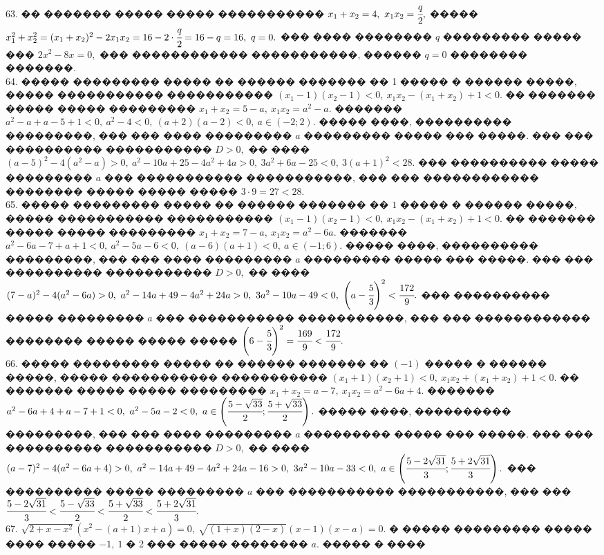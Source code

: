 \documentclass[12pt]{article}
\begin{document}
63. �� ������� ����� ����� ����������� $x_1+x_2=4,\ x_1x_2=\cfrac{q}{2},$ ����� $x_1^2+x_2^2=(x_1+x_2)^2-2x_1x_2=16-2\cdot\cfrac{q}{2}=16-q=16,\ q=0.$ ��� ���� �������� $q$ ��������� ����� ��� $2x^2-8x=0,$ ��� ������������ �����������, ������ $q=0$ �������� �������.\\
64. ����� ��������� ����� �� ������ ������� �� 1 ����� � ������ �����, ����� ����������� ����������� $(x_1-1)(x_2-1)<0,\ x_1x_2-(x_1+x_2)+1<0.$ �� ������� ����� ����� ��������� $x_1+x_2=5-a,\ x_1x_2=a^2-a.$ ������� $a^2-a+a-5+1<0,\
a^2-4<0,\ (a+2)(a-2)<0,\ a\in(-2;2).$ ����� ����, ���������� ���������, ��� ��� ���� ��������� $a$ ��������� ����� ��� �����. ��� ��� ���������� ����������� $D>0,$ �� ���� $(a-5)^2-4(a^2-a)>0,\ a^2-10a+25-4a^2+4a>0,\ 3a^2+6a-25<0,\ 3(a+1)^2<28.$ ��� ���������� ����� ��������� $a$ ��� ����������� �����������, ��� ��� ������������ �������� ����� ����� ����� $3\cdot9=27<28.$\\
65. ����� ��������� ����� �� ������ ������� �� $1$ ����� � ������ �����, ����� ����������� ����������� $(x_1-1)(x_2-1)<0,\ x_1x_2-(x_1+x_2)+1<0.$ �� ������� ����� ����� ��������� $x_1+x_2=7-a,\ x_1x_2=a^2-6a.$ ������� $a^2-6a-7+a+1<0,\ a^2-5a-6<0,\ (a-6)(a+1)<0,\ a\in(-1;6).$ ����� ����, ���������� ���������, ��� ��� ���� ��������� $a$ ��������� ����� ��� �����. ��� ��� ���������� ����������� $D>0,$ �� ���� $(7-a)^2-4(a^2-6a)>0,\ a^2-14a+49-4a^2+24a>0,\ 3a^2-10a-49<0,\ \left(a-\cfrac{5}{3}\right)^2<\cfrac{172}{9}.$ ��� ���������� ����� ��������� $a$ ��� ����������� �����������, ��� ��� ������������ �������� ����� ����� ����� $\left(6-\cfrac{5}{3}\right)^2=\cfrac{169}{9}<\cfrac{172}{9}.$\\
66. ����� ��������� ����� �� ������ ������� �� $(-1)$ ����� � ������ �����, ����� ����������� ����������� $(x_1+1)(x_2+1)<0,\ x_1x_2+(x_1+x_2)+1<0.$ �� ������� ����� ����� ��������� $x_1+x_2=a-7,\ x_1x_2=a^2-6a+4.$ ������� $a^2-6a+4+a-7+1<0,\ a^2-5a-2<0,\ a\in\left(\cfrac{5-\sqrt{33}}{2};\cfrac{5+\sqrt{33}}{2}\right).$ ����� ����, ���������� ���������, ��� ��� ���� ��������� $a$ ��������� ����� ��� �����. ��� ��� ���������� ����������� $D>0,$ �� ���� $(a-7)^2-4(a^2-6a+4)>0,\ a^2-14a+49-4a^2+24a-16>0,\ 3a^2-10a-33<0,\ a\in\left(\cfrac{5-2\sqrt{31}}{3};\cfrac{5+2\sqrt{31}}{3}\right).$ ��� ���������� ����� ��������� $a$ ��� ����������� �����������, ��� ��� $\cfrac{5-2\sqrt{31}}{3}<\cfrac{5-\sqrt{33}}{2}<\cfrac{5+\sqrt{33}}{2}<\cfrac{5+2\sqrt{31}}{3}.$\\
67. $\sqrt{2+x-x^2}(x^2-(a+1)x+a)=0,\ \sqrt{(1+x)(2-x)}(x-1)(x-a)=0.$ � ����� ��������� ����� ���� ����� $-1,\ 1$ � 2 ��� ����� �������� $a.$ ����� � ����
\end{document}
